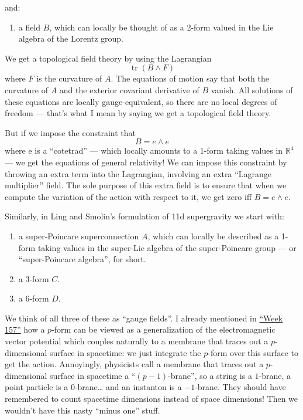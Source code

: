 \documentclass{article}
\def\tightlist{}
\begin{document}
and:

\begin{enumerate}
\def\labelenumi{\alph{enumi})}
\setcounter{enumi}{1}
\tightlist
\item
  a field \(B\), which can locally be thought of as a 2-form valued in
  the Lie algebra of the Lorentz group.
\end{enumerate}

We get a topological field theory by using the Lagrangian
\[\operatorname{tr}(B \wedge F)\] where \(F\) is the curvature of \(A\).
The equations of motion say that both the curvature of \(A\) and the
exterior covariant derivative of \(B\) vanish. All solutions of these
equations are locally gauge-equivalent, so there are no local degrees of
freedom --- that's what I mean by saying we get a topological field
theory.

But if we impose the constraint that \[B = e\wedge e\] where e is a
``cotetrad'' --- which locally amounts to a 1-form taking values in
\(\mathbb{R}^4\) --- we get the equations of general relativity! We can
impose this constraint by throwing an extra term into the Lagrangian,
involving an extra ``Lagrange multiplier'' field. The sole purpose of
this extra field is to ensure that when we compute the variation of the
action with respect to it, we get zero iff \(B = e\wedge e\).

Similarly, in Ling and Smolin's formulation of 11d supergravity we start
with:

\begin{enumerate}
\def\labelenumi{\alph{enumi})}
\item
  a super-Poincare superconnection \(A\), which can locally be described
  as a 1-form taking values in the super-Lie algebra of the
  super-Poincare group --- or ``super-Poincare algebra'', for short.
\item
  a 3-form \(C\).
\item
  a 6-form \(D\).
\end{enumerate}

We think of all three of these as ``gauge fields''. I already mentioned
in \protect\hyperlink{week157}{``Week 157''} how a \(p\)-form can be
viewed as a generalization of the electromagnetic vector potential which
couples naturally to a membrane that traces out a \(p\)-dimensional
surface in spacetime: we just integrate the \(p\)-form over this surface
to get the action. Annoyingly, physicists call a membrane that traces
out a \(p\)-dimensional surface in spacetime a ``\((p-1)\)-brane'', so a
string is a \(1\)-brane, a point particle is a \(0\)-brane\ldots{} and
an instanton is a \(-1\)-brane. They should have remembered to count
spacetime dimensions instead of space dimensions! Then we wouldn't have
this nasty ``minus one'' stuff.
\end{document}

